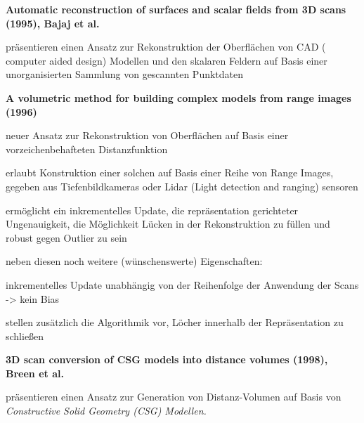 

\textbf{Automatic reconstruction of surfaces and scalar fields from 3D scans (1995), Bajaj et al.} \cite{bajaj1995automatic}


\begin{description}
\item
präsentieren einen Ansatz zur Rekonstruktion der Oberflächen von CAD ( computer aided design) Modellen und den skalaren Feldern auf Basis einer unorganisierten Sammlung von gescannten Punktdaten
\end{description}


\textbf{A volumetric method for building complex models from range images (1996)} \cite{curless1996volumetric} 

\begin{description}
\item
neuer Ansatz zur Rekonstruktion von Oberflächen auf Basis einer vorzeichenbehafteten Distanzfunktion
\item
erlaubt Konstruktion einer solchen auf Basis einer Reihe von Range Images, gegeben aus Tiefenbildkameras oder Lidar (Light detection and ranging) sensoren
\item
ermöglicht ein inkrementelles Update, die repräsentation gerichteter Ungenauigkeit, die Möglichkeit Lücken in der Rekonstruktion zu füllen und robust gegen Outlier zu sein
\item 
neben diesen noch weitere (wünschenswerte) Eigenschaften: 
\item
inkrementelles Update unabhängig von der Reihenfolge der Anwendung der Scans -> kein Bias
\item
stellen zusätzlich die Algorithmik vor, Löcher innerhalb der Repräsentation zu schließen
\end{description}


\textbf{3D scan conversion of CSG models into distance volumes (1998), Breen et al.} \cite{breen19983d}

\begin{description}
\item
präsentieren einen Ansatz zur Generation von Distanz-Volumen auf Basis von \emph{Constructive Solid Geometry (CSG) Modellen.}
\end{description}


